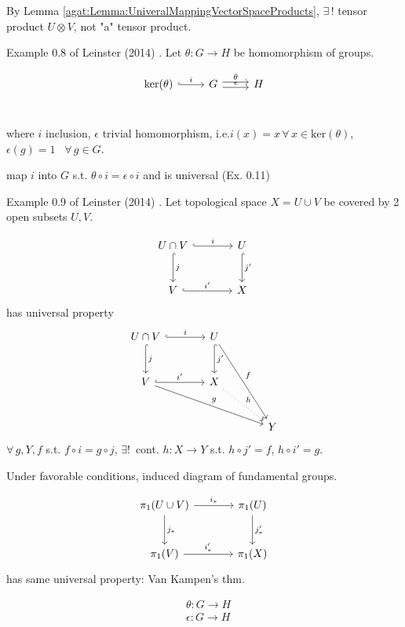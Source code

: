By Lemma \ref{agat:Lemma:UniveralMappingVectorSpaceProducts}, $\exists \, !$ tensor product $U\otimes V$, not "a" tensor product.

Example 0.8 of Leinster (2014) \cite{agat:Lein2014}. Let $\theta : G \to H$ be homomorphism of groups.

\[
\begin{tikzcd}
\text{ker}{(\theta)} \arrow[r, hook, "i"] & G \arrow[r, shift left, "\theta"] \arrow[r, shift right, "\epsilon"]& H \\
\end{tikzcd}
\]

where $i$ inclusion, $\epsilon$ trivial homomorphism, i.e.$i(x) = x \, \forall \, x \in \text{ker}(\theta)$, $\epsilon(g) = 1$ \, $\forall \, g \in G$.

map $i$ into $G$ s.t. $\theta \circ i = \epsilon \circ i$ and is universal (Ex. 0.11)

Example 0.9 of Leinster (2014) \cite{agat:Lein2014}. Let topological space $X = U \cup V$ be covered by 2 open subsets $U, V$.

\[
\begin{tikzcd}[sep=large] 
	U \cap V \arrow[r, hook, "i"] \arrow[d, hook, "j"] & U \arrow[d, hook, "j'"] \\
	V \arrow[r, hook, "i'"] & X
\end{tikzcd}
\]
has universal property
\[
\begin{tikzcd}[sep=large] 
U \cap V \arrow[r, hook, "i"] \arrow[d, hook, "j"] & U \arrow[d, hook, "j'"] \arrow[ddr, "f"] & \\
V \arrow[r, hook, "i'"] \arrow[drr, "g"] & X \arrow[dr, dotted, "h"] & \\
& & Y 
\end{tikzcd}
\]
$\forall \, g, Y, f$ s.t. $f\circ i = g\circ j$, $\exists ! \, $ cont. $h: X\to Y$ s.t. $h\circ j' = f$, $h\circ i' = g$.

Under favorable conditions, induced diagram of fundamental groups.

\[
\begin{tikzcd}[sep=large] 
\pi_1(U \cup V) \arrow[r, "i_*"] \arrow[d, "j_*"] & \pi_1(U) \arrow[d, "j'_*"] \\
\pi_1(V) \arrow[r, "i'_*"] & \pi_1(X)
\end{tikzcd}
\]
has same universal property: Van Kampen's thm.

\[
\begin{aligned}
& \theta : G \to H \\ 
& \epsilon : G \to H
\end{aligned}
\]

